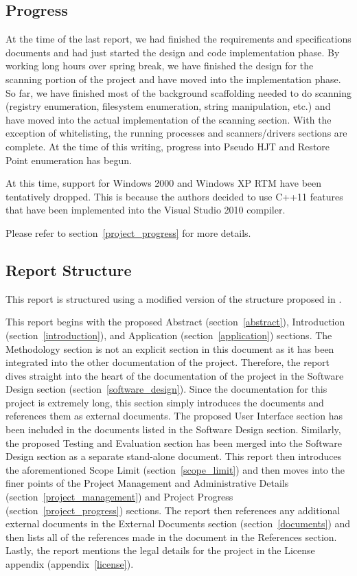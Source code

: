 \documentclass[letterpaper,12pt]{article}
\begin{document}
\subsection{Progress}
At the time of the last report, we had finished the requirements and
specifications documents and had just started the design and code implementation
phase.  By working long hours over spring break, we have finished the design for
the scanning portion of the project and have moved into the implementation
phase.  So far, we have finished most of the background scaffolding needed to do
scanning (registry enumeration, filesystem enumeration, string manipulation,
etc.) and have moved into the actual implementation of the scanning section. 
With the exception of whitelisting, the running processes and scanners/drivers
sections are complete.  At the time of this writing, progress into Pseudo HJT
and Restore Point enumeration has begun.  

At this time, support for Windows 2000 and Windows XP RTM have been tentatively
dropped.  This is because the authors decided to use C++11 features that have
been implemented into the Visual Studio 2010 compiler.  

Please refer to section~\ref{project_progress} for more details.  

\subsection{Report Structure}
This report is structured using a modified version of the structure proposed in
\cite{ReportGuidelines}.

This report begins with the proposed Abstract (section~\ref{abstract}),
Introduction (section~\ref{introduction}), and Application
(section~\ref{application}) sections.  The Methodology section is not an
explicit section in this document as it has been integrated into the other
documentation of the project.  Therefore, the report dives straight into the
heart of the documentation of the project in the Software Design section
(section~\ref{software_design}).  Since the documentation for this project is
extremely long, this section simply introduces the documents and references them
as external documents.  The proposed User Interface section has been included in
the documents listed in the Software Design section.  Similarly, the proposed
Testing and Evaluation section has been merged into the Software Design section
as a separate stand-alone document. This report then introduces the
aforementioned Scope Limit (section~\ref{scope_limit}) and then moves into the
finer points of the Project Management and Administrative Details
(section~\ref{project_management}) and Project Progress
(section~\ref{project_progress}) sections.  The report then references any
additional external documents in the External Documents section
(section~\ref{documents}) and then lists all of the references made in the
document in the References section.  Lastly, the report mentions the legal
details for the project in the License appendix (appendix~\ref{license}).
\end{document}
